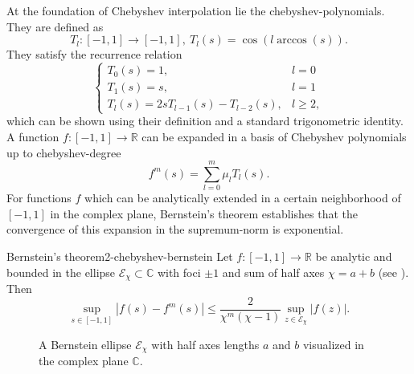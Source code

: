 At the foundation of Chebyshev interpolation lie the \glspl{chebyshev-polynomial}.
They are defined as \cite[chapter~3]{trefethen2019chebyshev}
\begin{equation}
    T_l: [-1, 1] \to [-1, 1],~T_l(s) = \cos(l \arccos(s)).
    \label{equ:2-chebyshev-chebyshev-definition}
\end{equation}
They satisfy the recurrence relation
\begin{equation}
    \begin{cases}
        T_0(s) = 1, & l = 0 \\
        T_1(s) = s, & l = 1 \\
        T_{l}(s) = 2s T_{l-1}(s) - T_{l-2}(s), & l \geq 2,
    \end{cases}
    \label{equ:2-chebyshev-chebyshev-recursion}
\end{equation}
which can be shown using their definition 
and a standard trigonometric identity.\\

A function $f:[-1, 1] \to \mathbb{R}$ can be expanded in a basis of Chebyshev
polynomials up to \gls{chebyshev-degree} \cite[chapter~3]{trefethen2019chebyshev}
\begin{equation}
    f^m(s) = \sum_{l=0}^m \mu_l T_l(s).
    \label{equ:2-chebyshev-chebyshev-expansion-general}
\end{equation}
For functions $f$ which can be analytically extended in a certain neighborhood
of $[-1, 1]$ in the complex plane, Bernstein's theorem \cite[theorem~73]{meinardus1967approximation}
establishes that the convergence of this expansion in the supremum-norm is
exponential.
\begin{theorem}{Bernstein's theorem}{2-chebyshev-bernstein}
    Let $f:[-1, 1] \to \mathbb{R}$ be analytic and bounded in the ellipse $\mathcal{E}_{\chi} \subset \mathbb{C}$
    with foci $\pm 1$ and sum of half axes $\chi = a + b$ (see ).
    Then
    \begin{equation}
        \sup_{s \in [-1, 1]} |f(s) - f^m(s)| \leq \frac{2}{\chi^m(\chi-1)} \sup_{z \in \mathcal{E}_{\chi}} |f(z)|.
        \label{equ:2-chebyshev-bernstein-convergence-result}
    \end{equation}
\end{theorem}

\begin{figure}[ht]
    \centering
    
    \caption{A Bernstein ellipse $\mathcal{E}_{\chi}$ with half axes lengths $a$ and
        $b$ visualized in the complex plane $\mathbb{C}$.}
    \label{fig:2-chebyshev-proof-bernstein-ellipse}
\end{figure}


